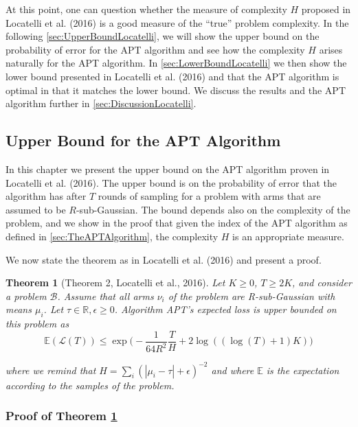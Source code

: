 \documentclass[11pt,]{article}
\newtheorem{theorem}{Theorem}
\begin{document}
At this point, one can question whether the measure of complexity \(H\)
proposed in Locatelli et al. (2016) is a good measure of the ``true''
problem complexity. In the following \autoref{sec:UpperBoundLocatelli},
we will show the upper bound on the probability of error for the APT
algorithm and see how the complexity \(H\) arises naturally for the APT
algorithm. In \autoref{sec:LowerBoundLocatelli} we then show the lower
bound presented in Locatelli et al. (2016) and that the APT algorithm is
optimal in that it matches the lower bound. We discuss the results and
the APT algorithm further in \autoref{sec:DiscussionLocatelli}.

\subsection{\texorpdfstring{Upper Bound for the APT Algorithm
\label{sec:UpperBoundLocatelli}}{Upper Bound for the APT Algorithm }}\label{upper-bound-for-the-apt-algorithm}

In this chapter we present the upper bound on the APT algorithm proven
in Locatelli et al. (2016). The upper bound is on the probability of
error that the algorithm has after \(T\) rounds of sampling for a
problem with arms that are assumed to be \(R\)-sub-Gaussian. The bound
depends also on the complexity of the problem, and we show in the proof
that given the index of the APT algorithm as defined in
\autoref{sec:TheAPTAlgorithm}, the complexity \(H\) is an appropriate
measure.

We now state the theorem as in Locatelli et al. (2016) and present a
proof.

\begin{theorem}[Theorem 2, Locatelli et al., 2016] \label{theorem:LocatelliTheorem4}
Let $K \geq 0$, $T \geq 2K$, and consider a problem $\mathcal{B}$. Assume that all arms $\nu_i$ of the problem are R-sub-Gaussian with means $\mu_i$. Let $\tau \in \mathbb{R}, \epsilon \geq 0$. Algorithm APT's expected loss is upper bounded on this problem as 
\begin{equation*} \mathbb{E}(\mathcal{L}(T)) \leq \exp
\Big(-\frac{1}{64R^2}\frac{T}{H} + 2 \log((\log(T) + 1)K)\Big) \end{equation*}

where we remind that $H = \sum_i (|\mu_i - \tau | + \epsilon)^{-2}$ and where
$\mathbb{E}$ is the expectation according to the samples of the problem.
\end{theorem}

\subsubsection{\texorpdfstring{Proof of Theorem
\ref{theorem:LocatelliTheorem4}}{Proof of Theorem }}\label{proof-of-theorem}
\end{document}
